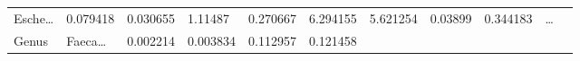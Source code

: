 \documentclass[
]{article}
\begin{document}
\begin{longtable}[]{@{}lllllllllll@{}}
\begin{minipage}[t]{0.06\columnwidth}
Esche\ldots{}\strut
\end{minipage} & \begin{minipage}[t]{0.09\columnwidth}\raggedright
0.079418\strut
\end{minipage} & \begin{minipage}[t]{0.06\columnwidth}\raggedright
0.030655\strut
\end{minipage} & \begin{minipage}[t]{0.09\columnwidth}\raggedright
1.11487\strut
\end{minipage} & \begin{minipage}[t]{0.06\columnwidth}\raggedright
0.270667\strut
\end{minipage} & \begin{minipage}[t]{0.09\columnwidth}\raggedright
6.294155\strut
\end{minipage} & \begin{minipage}[t]{0.06\columnwidth}\raggedright
5.621254\strut
\end{minipage} & \begin{minipage}[t]{0.06\columnwidth}\raggedright
0.03899\strut
\end{minipage} & \begin{minipage}[t]{0.06\columnwidth}\raggedright
0.344183\strut
\end{minipage} & \begin{minipage}[t]{0.03\columnwidth}\raggedright
\ldots{}\strut
\end{minipage}\tabularnewline
\begin{minipage}[t]{0.06\columnwidth}\raggedright
Genus\strut
\end{minipage} & \begin{minipage}[t]{0.06\columnwidth}\raggedright
Faeca\ldots{}\strut
\end{minipage} & \begin{minipage}[t]{0.09\columnwidth}\raggedright
0.002214\strut
\end{minipage} & \begin{minipage}[t]{0.06\columnwidth}\raggedright
0.003834\strut
\end{minipage} & \begin{minipage}[t]{0.09\columnwidth}\raggedright
0.112957\strut
\end{minipage} & \begin{minipage}[t]{0.06\columnwidth}\raggedright
0.121458\strut
\end{minipage} & \begin{minipage}[t]{0.09\columnwidth}\raggedright

\end{minipage}
\end{longtable}
\end{document}
